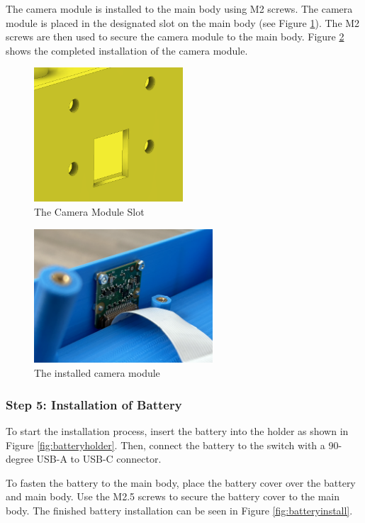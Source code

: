 The camera module is installed to the main body using M2 screws. The camera module is placed in the designated slot on the main body (see Figure \ref{fig:cameraslot}). The M2 screws are then used to secure the camera module to the main body. Figure \ref{fig:camerainstall} shows the completed installation of the camera module.

\begin{figure}[!ht]
    \centering
    \includegraphics[height=5cm]{texs/Part1/chapter5/image/camslot.png}
    \caption{The Camera Module Slot}
    \label{fig:cameraslot}
\end{figure}

\begin{figure}[!ht]
    \centering
    \includegraphics[height=5cm]{texs/Part1/chapter5/image/caminstall.jpg}
    \caption{The installed camera module}
    \label{fig:camerainstall}
\end{figure}

\subsubsection{Step 5: Installation of Battery}
To start the installation process, insert the battery into the holder as shown in Figure \ref{fig:batteryholder}. Then, connect the battery to the switch with a 90-degree USB-A to USB-C connector.

To fasten the battery to the main body, place the battery cover over the battery and main body. Use the M2.5 screws to secure the battery cover to the main body. The finished battery installation can be seen in Figure \ref{fig:batteryinstall}.


